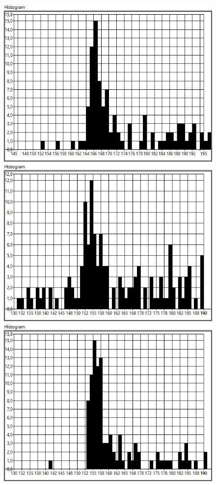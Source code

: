 \begin{figure}[ht]
    \centering
        \includegraphics[scale=0.2] {./mesurment/data/Expected_170,0__Mean_176,02__Distrubution_13,567648_Rotating_1ms}
        \includegraphics[scale=0.2] {./mesurment/data/Expected_160,0__Mean_161,13__Distrubution_14,311767_Rotating_5ms}\\
        \includegraphics[scale=0.2] {./mesurment/data/Expected_160,0__Mean_161,29__Distrubution_10,066412_Rotating_10ms}

\end{figure}
